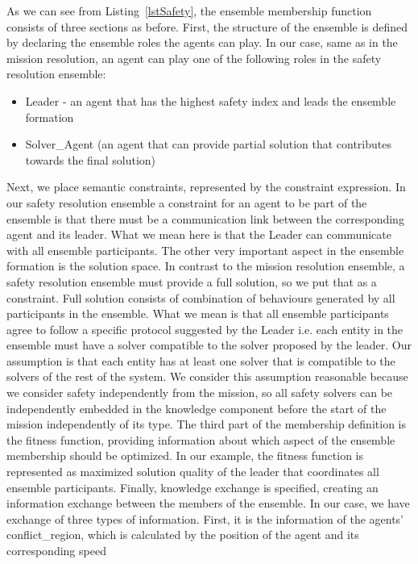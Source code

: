 \documentclass[journal]{IEEEtran}
\theoremstyle{definition}
\newcommand\patrizio[1]{\nb{Patrizio}{#1}}
\begin{document}
As we can see from Listing~\ref{lstSafety},
the  ensemble  membership  function  consists  of  three  sections as before. First, the structure of the ensemble is defined by declaring the ensemble roles the agents can play. In  our  case, same as in the mission resolution, an  agent  can  play one  of  the  following  roles in the safety resolution ensemble:
\begin{itemize}
\item Leader - an agent that has the highest safety index and leads the ensemble formation
\item Solver\_Agent  (an  agent  that  can provide partial solution that contributes towards the final solution)
\end{itemize}
Next,  we  place  semantic  constraints,  represented  by  the constraint  expression.  In  our  safety resolution ensemble a  constraint  for  an agent  to  be  part of  the  ensemble  is  that  there  must  be  a communication  link between  the  corresponding  agent  and its  leader.  What  we  mean  here  is  that the Leader can communicate with all ensemble participants. The other very important aspect in the ensemble formation is the solution space. In contrast to the mission resolution ensemble, a safety resolution ensemble must provide a full solution, so we put that as a constraint. Full solution consists of combination of behaviours generated by all participants in the ensemble. What we mean is that all ensemble participants agree to follow a specific protocol suggested by the Leader i.e. each entity in the ensemble must have a solver compatible to the solver proposed by the leader. Our assumption is that each entity has at least one solver that is compatible to the solvers of the rest of the system. We consider this assumption reasonable because we consider safety independently from the mission, so 
all safety solvers can be independently embedded in the knowledge component before the start of the mission independently of its type.  
The third part of the membership definition  is  the  fitness  function, providing  information  about which  aspect  of  the  ensemble  membership  should  be  optimized. In  our  example,  the  fitness  function  is represented as maximized solution quality of the leader that coordinates all ensemble participants. 
Finally, knowledge exchange is specified, creating an information exchange between the members of the ensemble.  In  our  case,  we  have  exchange  of  three  types  of information.  First,  it is  the  information  of the agents' conflict\_region, which is calculated by the position of the agent and its corresponding speed 
\end{document}
